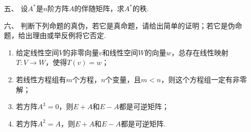 \begin{enumerate}
	\item[五、]设$A^*$是$n$阶方阵$A$的伴随矩阵，求$A^*$的秩.
	\item[六、]判断下列命题的真伪，若它是真命题，请给出简单的证明；若它是伪命题，给出理由或举反例将它否定.
	\begin{enumerate}[label=(\arabic*)]
        \item 给定线性空间$V$的非零向量$v$和线性空间$W$的向量$w$，总存在线性映射$T:V\to W$，使得$T(v)=w$；
        \item 若线性方程组有$m$个方程，$n$个变量，且$m<n$，则这个方程组一定有非零解；
        \item 若方阵$A^3=0$，则$E+A$和$E-A$都是可逆矩阵；
        \item 若方阵$A^2=A$，则$E+A$和$E-A$都是可逆矩阵.
    \end{enumerate}
\end{enumerate}
\newpage
